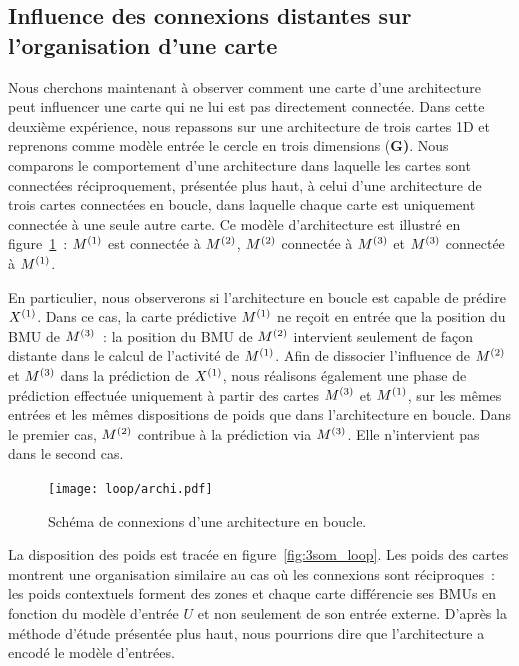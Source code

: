\documentclass[../main]{subfiles}
\begin{document}
\subsection{Influence des connexions distantes sur l'organisation d'une carte}

Nous cherchons maintenant à observer comment une carte d'une architecture peut influencer une carte qui ne lui est pas directement connectée.
Dans cette deuxième expérience, nous repassons sur une architecture de trois cartes 1D et reprenons comme modèle entrée le cercle en trois dimensions (\textbf{G)}. 
Nous comparons le comportement d'une architecture dans laquelle les cartes sont connectées réciproquement, présentée plus haut, à celui d'une architecture de trois cartes connectées en boucle, dans laquelle chaque carte est uniquement connectée à une seule autre carte. 
Ce modèle d'architecture est illustré en figure~\ref{fig:archi_loop}~: $M^{({1})}$ est connectée à $M^{({2})}$, $M^{({2})}$ connectée à $M^{({3})}$ et $M^{({3})}$ connectée à $M^{({1})}$.

En particulier, nous observerons si l'architecture en boucle est capable de prédire $X^{({1})}$. 
Dans ce cas, la carte prédictive $M^{({1})}$ ne reçoit en entrée que la position du BMU de $M^{({3})}$~: la position du BMU de $M^{({2})}$ intervient seulement de façon distante dans le calcul de l'activité de $M^{({1})}$.
Afin de dissocier l'influence de $M^{({2})}$ et $M^{({3})}$ dans la prédiction de $X^{({1})}$, nous réalisons également une phase de prédiction effectuée uniquement à partir des cartes $M^{({3})}$ et $M^{({1})}$, sur les mêmes entrées et les mêmes dispositions de poids que dans l'architecture en boucle.
Dans le premier cas, $M^{({2})}$ contribue à la prédiction via $M^{({3})}$.
Elle n'intervient pas dans le second cas.

\begin{figure}[h!]
	\centering\texttt{[image: loop/archi.pdf]}
	\caption{Schéma de connexions d'une architecture en \og boucle\fg{}. \label{fig:archi_loop}}
\end{figure}

La disposition des poids est tracée en figure~\ref{fig:3som_loop}.
Les poids des cartes montrent une organisation similaire au cas où les connexions sont réciproques~: les poids contextuels forment des zones et chaque carte différencie ses BMUs en fonction du modèle d'entrée $U$ et non seulement de son entrée externe.
D'après la méthode d'étude présentée plus haut, nous pourrions dire que l'architecture a encodé le modèle d'entrées.
\end{document}
